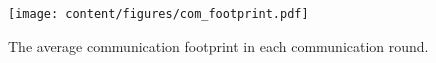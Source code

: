 \begin{figure}
  \centering
  \texttt{[image: content/figures/com\_footprint.pdf]}
  \caption{The average communication footprint in each communication round.}
  \label{fig:com_footprint}
\end{figure}

